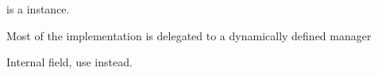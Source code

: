 \documentclass[letterpaper,10pt,russian]{sphinxmanual}
\begin{document}
\begin{fulllineitems}
\begin{fulllineitems}
\sphinxAtStartPar
{} is a  instance.

\sphinxAtStartPar
Most of the implementation is delegated to a dynamically defined manager

\end{fulllineitems}


\begin{fulllineitems}
\label{\detokenize{myapp:polls.models.Order.objects}}
\pysigstartsignatures
\pysigline
{}
\pysigstopsignatures
\end{fulllineitems}


\begin{fulllineitems}
\label{\detokenize{myapp:polls.models.Order.user_id}}
\pysigstartsignatures
\pysigline
{}
\pysigstopsignatures
\sphinxAtStartPar
Internal field, use {\hyperref[\detokenize{myapp:polls.models.Order.user}]{}} instead.

\end{fulllineitems}


\end{fulllineitems}

\end{document}
